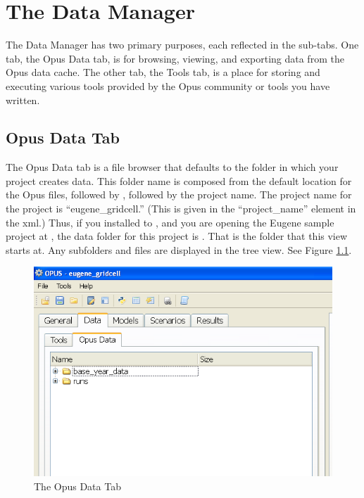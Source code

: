 \chapter{The Data Manager}
The Data Manager
has two primary purposes, each reflected in the sub-tabs.  One tab, the 
Opus Data tab, is for browsing, viewing, and exporting data from the Opus data cache.  
The other tab, the Tools tab,
is a place for storing and executing 
various tools provided by the Opus community or tools you have written.

\section{Opus Data Tab}

The Opus Data tab is a file browser that defaults to the folder in which
your project creates data.  This folder name is composed from the default 
location for the Opus files, followed by , followed by the project
name.  The project name for the  project is
``eugene\_gridcell.'' (This is given in the ``project\_name'' element in the xml.)
Thus, if you installed to
, and you are opening the Eugene sample project at
, the data folder
for this project is .  That is the
folder that this view starts at.  Any subfolders and files are displayed in
the tree view.  See Figure \ref{fig:opusdatatab}.

\begin{figure}[htp]
\begin{center}
\includegraphics[scale=0.6]{part-gui/images/data-manager-opus-data-tab.png}
\end{center}
\caption{The Opus Data Tab}
\label{fig:opusdatatab}
\end{figure}

